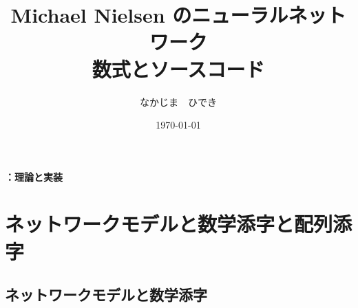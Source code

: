 \documentclass[11pt,a4j,fleqn]{jarticle}
\newcounter{apart}
\begin{document}
\title{
	\textbf{\Large  Michael Nielsen のニューラルネットワーク\\
	\bigskip
	数式とソースコード}\\
	\bigskip
}

\bigskip
\bigskip
\author{なかじま　ひでき}
\date{\today}
\maketitle
\renewcommand{\theapart}{}
\setcounter{apart}{1}

\textbf{\Large \theapart ：理論と実装}

\section{ネットワークモデルと数学添字と配列添字}
\subsection{ネットワークモデルと数学添字} 
\end{document}
